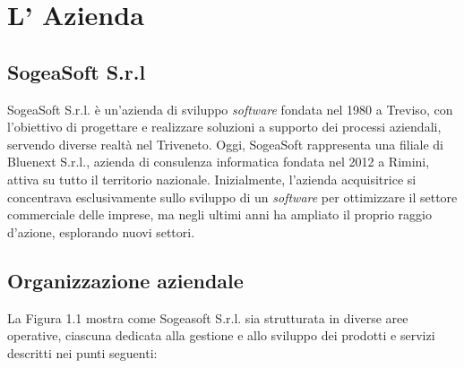 \chapter{L' Azienda}
    \section{SogeaSoft S.r.l}
    SogeaSoft S.r.l. è un'azienda di sviluppo \textit{software} fondata nel 1980 a Treviso, con l'obiettivo di progettare e realizzare soluzioni a supporto dei processi aziendali, servendo diverse realtà nel Triveneto.
    Oggi, SogeaSoft rappresenta una filiale di Bluenext S.r.l., azienda di consulenza informatica fondata nel 2012 a Rimini, attiva su tutto il territorio nazionale. Inizialmente, l'azienda acquisitrice si concentrava esclusivamente sullo sviluppo di un \textit{software} per ottimizzare il settore commerciale delle imprese, ma negli ultimi anni ha ampliato il proprio raggio d'azione, esplorando nuovi settori.
    
    \section{Organizzazione aziendale}
    La Figura 1.1 mostra come Sogeasoft S.r.l. sia strutturata in diverse aree operative, ciascuna dedicata alla gestione e allo sviluppo dei prodotti e servizi descritti nei punti seguenti: 
    
